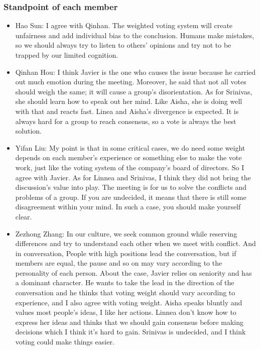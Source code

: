 		\subsubsection{Standpoint of each member}
		\begin{itemize}
  			\item Hao Sun: I agree with Qinhan. The weighted voting system will create unfairness and add individual bias to the conclusion. Humans make mistakes, so we should always try to listen to others' opinions and try not to be trapped by our limited cognition.
  			\item Qinhan Hou: I think Javier is the one who causes the issue because he carried out much emotion during the meeting. Moreover, he said that not all votes should weigh the same; it will cause a group's disorientation.  As for Srinivas, she should learn how to speak out her mind. Like Aisha, she is doing well with that and reacts fast. Linea and Aisha's divergence is expected. It is always hard for a group to reach consensus, so a vote is always the best solution.
  			\item Yifan Liu: My point is that in some critical cases, we do need some weight depends on each member's experience or something else to make the vote work, just like the voting system of the company's board of directors. So I agree with Javier. As for Linnea and Srinivas, I think they did not bring the discussion's value into play. The meeting is for us to solve the conflicts and problems of a group. If you are undecided, it means that there is still some disagreement within your mind. In such a case, you should make yourself clear.
  			\item Zezhong Zhang: In our culture, we seek common ground while reserving differences and try to understand each other when we meet with conflict. And in conversation, People with high positions lead the conversation, but if members are equal, the pause and so on may vary according to the personality of each person. About the case, Javier relies on seniority and has a dominant character. He wants to take the lead in the direction of the conversation and he thinks that voting weight should vary according to experience, and I also agree with voting weight. Aisha speaks bluntly and values most people’s ideas, I like her actions. Linnea don't know how to express her ideas and thinks that we should gain consensus before making decisions which I think it's hard to gain. Srinivas is undecided, and I think voting could make things easier. 
		\end{itemize}
